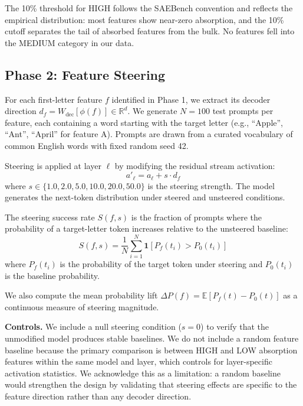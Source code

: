 \documentclass{article}
\begin{document}
The 10\% threshold for HIGH follows the SAEBench convention and reflects the empirical distribution: most features show near-zero absorption, and the 10\% cutoff separates the tail of absorbed features from the bulk. No features fell into the MEDIUM category in our data.

\subsection{Phase 2: Feature Steering}

For each first-letter feature $f$ identified in Phase 1, we extract its decoder direction $d_f = W_{\text{dec}}[\phi(f)] \in \mathbb{R}^d$. We generate $N = 100$ test prompts per feature, each containing a word starting with the target letter (e.g., ``Apple'', ``Ant'', ``April'' for feature A). Prompts are drawn from a curated vocabulary of common English words with fixed random seed 42.

Steering is applied at layer $\ell$ by modifying the residual stream activation:
\begin{equation}
a'_\ell = a_\ell + s \cdot d_f
\end{equation}
where $s \in \{1.0, 2.0, 5.0, 10.0, 20.0, 50.0\}$ is the steering strength. The model generates the next-token distribution under steered and unsteered conditions.

The steering success rate $S(f, s)$ is the fraction of prompts where the probability of a target-letter token increases relative to the unsteered baseline:
\begin{equation}
S(f, s) = \frac{1}{N} \sum_{i=1}^{N} \mathbf{1}\left[ P_f(t_i) > P_0(t_i) \right]
\end{equation}
where $P_f(t_i)$ is the probability of the target token under steering and $P_0(t_i)$ is the baseline probability.

We also compute the mean probability lift $\Delta P(f) = \mathbb{E}[P_f(t) - P_0(t)]$ as a continuous measure of steering magnitude.

\textbf{Controls.} We include a null steering condition ($s = 0$) to verify that the unmodified model produces stable baselines. We do not include a random feature baseline because the primary comparison is between HIGH and LOW absorption features within the same model and layer, which controls for layer-specific activation statistics. We acknowledge this as a limitation: a random baseline would strengthen the design by validating that steering effects are specific to the feature direction rather than any decoder direction.
\end{document}
